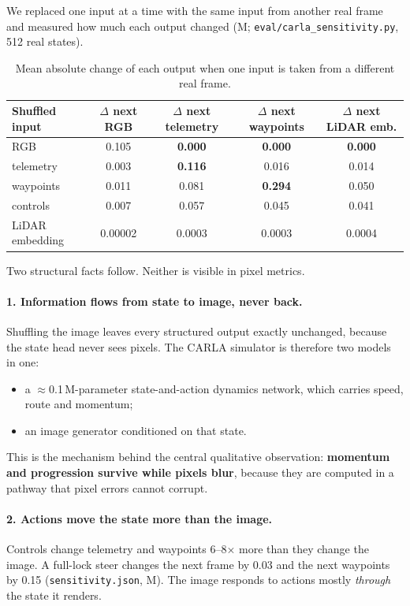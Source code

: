\documentclass[11pt]{article}
\begin{document}
We replaced one input at a time with the same input from another real frame and measured how much each output changed (M; \texttt{eval/carla\_sensitivity.py}, 512 real states).

\begin{table}[!htbp]
  \centering
  \small
  \caption{Mean absolute change of each output when one input is taken from a different real frame.}
  \label{tab:sensitivity}
  \begin{tabular}{@{}lcccc@{}}
    \toprule
    Shuffled input & $\Delta$ next RGB & $\Delta$ next telemetry & $\Delta$ next waypoints & $\Delta$ next LiDAR emb. \\
    \midrule
    RGB & 0.105 & \textbf{0.000} & \textbf{0.000} & \textbf{0.000} \\
    telemetry & 0.003 & \textbf{0.116} & 0.016 & 0.014 \\
    waypoints & 0.011 & 0.081 & \textbf{0.294} & 0.050 \\
    controls & 0.007 & 0.057 & 0.045 & 0.041 \\
    LiDAR embedding & 0.00002 & 0.0003 & 0.0003 & 0.0004 \\
    \bottomrule
  \end{tabular}
\end{table}

Two structural facts follow. Neither is visible in pixel metrics.

\paragraph{1. Information flows from state to image, never back.} Shuffling the image leaves every structured output exactly unchanged, because the state head never sees pixels. The CARLA simulator is therefore two models in one:
\begin{itemize}
  \item a $\approx$0.1\,M-parameter state-and-action dynamics network, which carries speed, route and momentum;
  \item an image generator conditioned on that state.
\end{itemize}
This is the mechanism behind the central qualitative observation: \textbf{momentum and progression survive while pixels blur}, because they are computed in a pathway that pixel errors cannot corrupt.

\paragraph{2. Actions move the state more than the image.} Controls change telemetry and waypoints 6--8$\times$ more than they change the image. A full-lock steer changes the next frame by 0.03 and the next waypoints by 0.15 (\texttt{sensitivity.json}, M). The image responds to actions mostly \emph{through} the state it renders.
\end{document}
